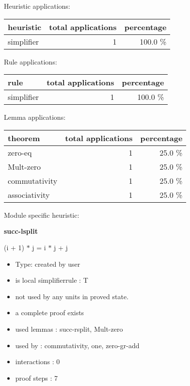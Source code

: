 \documentclass[a4paper]{article}
\begin{document}
\medskip


Heuristic applications:

\begin{supertabular}{l|r|r}
heuristic	& total applications & percentage \\ \hline
simplifier & 1 & 100.0 \% \\

\end{supertabular}

Rule applications:

\begin{supertabular}{l|r|r}
rule	        & total applications & percentage \\ \hline
simplifier & 1 & 100.0 \% \\

\end{supertabular}

Lemma applications:

\begin{supertabular}{l|r|r}
theorem	        & total applications & percentage \\ \hline
zero-eq & 1 & 25.0 \% \\
Mult-zero & 1 & 25.0 \% \\
commutativity & 1 & 25.0 \% \\
associativity & 1 & 25.0 \% \\

\end{supertabular}

Module specific heuristic:

\pagebreak

{\LARGE\bf succ-lsplit}\label{lemma-succ-lsplit}

\medskip

 \Fol (i + 1) $*$ j = i $*$ j + j

\begin{itemize}

\item Type: created by user

\item is local simplifierrule : T
\item not used by any units in proved state.
\item       a complete proof exists
\item       used lemmas  : succ-rsplit, Mult-zero
\item       used by      : commutativity, one, zero-gr-add
\item       interactions : 0
\item       proof steps  : 7
\end{itemize}
\end{document}
